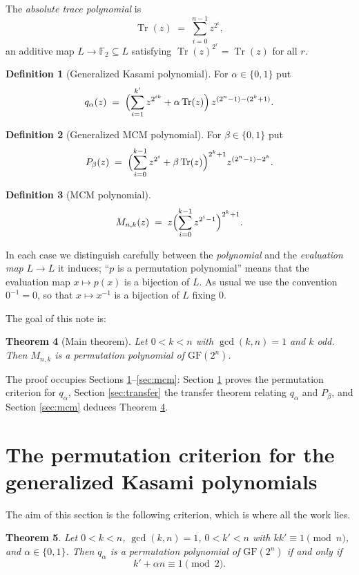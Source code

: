 \documentclass[11pt,a4paper]{article}
\newtheorem{theorem}{Theorem}[section]
\theoremstyle{definition}
\newtheorem{definition}[theorem]{Definition}
\newcommand{\F}{\mathbb{F}}
\newcommand{\GF}{\mathrm{GF}}
\newcommand{\Tr}{\operatorname{Tr}}
\begin{document}
The \emph{absolute trace polynomial} is
\[
  \Tr(z)\;=\;\sum_{i=0}^{n-1}z^{2^{i}} ,
\]
an additive map $L\to\F_2\subseteq L$ satisfying $\Tr(z)^{2^{r}}=\Tr(z)$ for all
$r$.

\begin{definition}[Generalized Kasami polynomial]
For $\alpha\in\{0,1\}$ put
\[
  q_\alpha(z)\;=\;\Bigl(\sum_{i=1}^{k'}z^{2^{ik}}+\alpha\Tr(z)\Bigr)\,
                 z^{(2^{n}-1)-(2^{k}+1)} .
\]
\end{definition}

\begin{definition}[Generalized MCM polynomial]
For $\beta\in\{0,1\}$ put
\[
  P_\beta(z)\;=\;\Bigl(\sum_{i=0}^{k-1}z^{2^{i}}+\beta\Tr(z)\Bigr)^{2^{k}+1}
                 z^{(2^{n}-1)-2^{k}} .
\]
\end{definition}

\begin{definition}[MCM polynomial]
\[
  M_{n,k}(z)\;=\;z\Bigl(\sum_{i=0}^{k-1}z^{2^{i}-1}\Bigr)^{2^{k}+1}.
\]
\end{definition}

In each case we distinguish carefully between the \emph{polynomial} and the
\emph{evaluation map} $L\to L$ it induces; ``$p$ is a permutation polynomial''
means that the evaluation map $x\mapsto p(x)$ is a bijection of $L$.  As usual we
use the convention $0^{-1}=0$, so that $x\mapsto x^{-1}$ is a bijection of $L$
fixing $0$.

The goal of this note is:

\begin{theorem}[Main theorem]\label{thm:main}
Let $0<k<n$ with $\gcd(k,n)=1$ and $k$ odd.  Then $M_{n,k}$ is a permutation
polynomial of $\GF(2^{n})$.
\end{theorem}

The proof occupies Sections \ref{sec:kasami}--\ref{sec:mcm}: Section
\ref{sec:kasami} proves the permutation criterion for $q_\alpha$, Section
\ref{sec:transfer} the transfer theorem relating $q_\alpha$ and $P_\beta$, and
Section \ref{sec:mcm} deduces Theorem \ref{thm:main}.

\section{The permutation criterion for the generalized Kasami polynomials}
\label{sec:kasami}

The aim of this section is the following criterion, which is where all the work
lies.

\begin{theorem}\label{thm:kasami}
Let $0<k<n$, $\gcd(k,n)=1$, $0<k'<n$ with $kk'\equiv1\pmod n$, and
$\alpha\in\{0,1\}$.  Then $q_\alpha$ is a permutation polynomial of $\GF(2^{n})$
if and only if
\[
  k'+\alpha n\equiv 1 \pmod 2 .
\]
\end{theorem}
\end{document}
